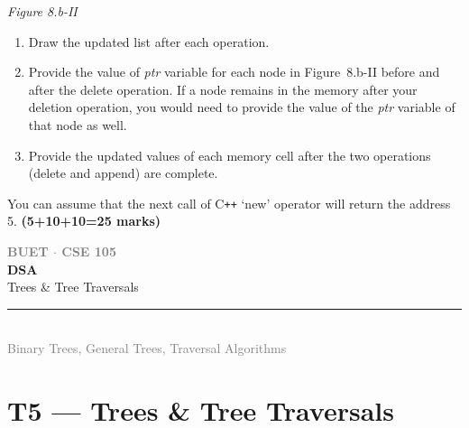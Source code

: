 \documentclass[12pt,a3paper]{article}
\newcommand{\mk}[1]{\textcolor{orange!70!black}{\small\textbf{(#1 marks)}}}
\newcommand{\secdivider}[4]{%
  \newpage\thispagestyle{empty}%
  \vspace*{\fill}%
  \begin{tcolorbox}[enhanced,colback=#4!7,colframe=#3,boxrule=1.5pt,arc=8pt,
    left=20pt,right=20pt,top=22pt,bottom=22pt,
    shadow={3pt}{-3pt}{0pt}{black!15}]
    \centering
    {\large\textcolor{gray}{\textbf{BUET $\cdot$ CSE 105}}}\\[8pt]
    {\fontsize{26}{32}\selectfont\bfseries\textcolor{#3}{DSA}}\\[6pt]
    {\fontsize{15}{19}\selectfont\textcolor{dgray}{#1}}\\[12pt]
    \textcolor{#3!60}{\rule{0.5\textwidth}{0.5pt}}\\[6pt]
    {\small\textcolor{gray}{#2}}
  \end{tcolorbox}%
  \vspace*{\fill}\newpage%
}
\begin{document}
\begin{enumerate}
\begin{center}

\smallskip
\textit{Figure 8.b-II}
\end{center}

\begin{enumerate}[label=(\roman*)]
  \item Draw the updated list after each operation.
  \item Provide the value of \textit{ptr} variable for each node in Figure~8.b-II
  before and after the delete operation. If a node remains in the memory after
  your deletion operation, you would need to provide the value of the \textit{ptr}
  variable of that node as well.
  \item Provide the updated values of each memory cell after the two operations
  (delete and append) are complete.
\end{enumerate}

You can assume that the next call of C\texttt{++} `new' operator will return the
address 5. \mk{5+10+10=25}

\end{enumerate}
\newpage

\secdivider{Trees \& Tree Traversals}{Binary Trees, General Trees, Traversal Algorithms}{cE}{cE}
\label{sec:T5}
\section{T5 --- Trees \& Tree Traversals}
\end{document}
